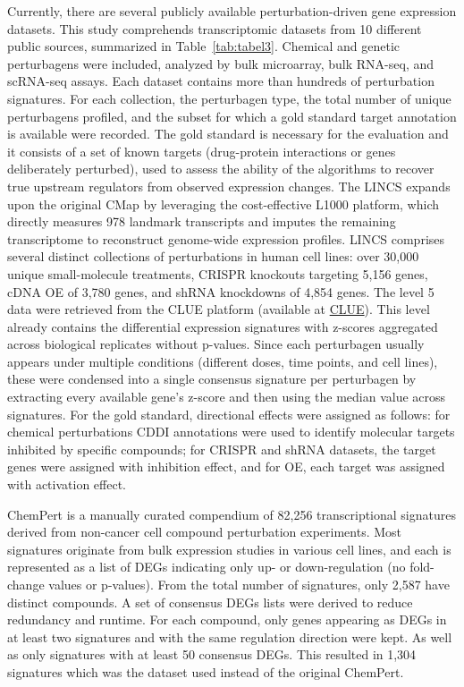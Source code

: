 Currently, there are several publicly available perturbation-driven gene expression datasets. This study comprehends transcriptomic datasets from 10 different public sources, summarized in Table~\ref{tab:tabel3}. Chemical and genetic perturbagens were included, analyzed by bulk microarray, bulk \gls{RNA-seq}, and \gls{scRNA-seq} assays. Each dataset contains more than hundreds of perturbation signatures. For each collection, the perturbagen type, the total number of unique perturbagens profiled, and the subset for which a gold standard target annotation is available were recorded. The gold standard is necessary for the evaluation and it consists of a set of known targets (drug-protein interactions or genes deliberately perturbed), used to assess the ability of the algorithms to recover true upstream regulators from observed expression changes. 
The \gls{LINCS} expands upon the original \gls{CMap} by leveraging the cost-effective L1000 platform, which directly measures 978 landmark transcripts and imputes the remaining transcriptome to reconstruct genome-wide expression profiles. \gls{LINCS} comprises several distinct collections of perturbations in human cell lines: over 30,000 unique small-molecule treatments, \gls{CRISPR} knockouts targeting 5,156 genes, c\gls{DNA} \gls{OE} of 3,780 genes, and shRNA knockdowns of 4,854 genes. The level 5 data were retrieved from the CLUE platform (available at \href{https://clue.io/data/CMap2020#LINCS2020}{CLUE}). This level already contains the differential expression signatures with z-scores aggregated across biological replicates without p-values.
Since each perturbagen usually appears under multiple conditions (different doses, time points, and cell lines), these were condensed into a single consensus signature per perturbagen by extracting every available gene's z-score and then using the median value across signatures.
For the gold standard, directional effects were assigned as follows: for chemical perturbations \gls{CDDI} annotations were used to identify molecular targets inhibited by specific compounds; for \gls{CRISPR} and \gls{shRNA} datasets, the target genes were assigned with inhibition effect, and for \gls{OE}, each target was assigned with activation effect.

ChemPert is a manually curated compendium of 82,256 transcriptional signatures derived from non-cancer cell compound perturbation experiments. Most signatures originate from bulk expression studies in various cell lines, and each is represented as a list of \gls{DEGs} indicating only up- or down-regulation (no fold-change values or p-values). From the total number of signatures, only 2,587 have distinct compounds. A set of consensus \gls{DEGs} lists were derived to reduce redundancy and runtime. For each compound, only genes appearing as \gls{DEGs} in at least two signatures and with the same regulation direction were kept. As well as only signatures with at least 50 consensus \gls{DEGs}. This resulted in 1,304 signatures which was the dataset used instead of the original ChemPert.

